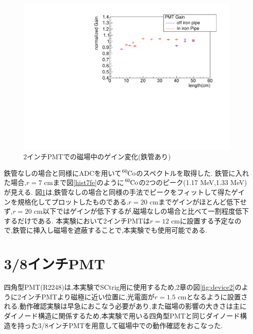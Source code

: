 \begin{figure}[h]
	\centering
		\includegraphics[angle=-90,width=15cm]{fig/iguchi/bigPMTfit.pdf}
	\caption{2インチPMTでの磁場中のゲイン変化(鉄管あり)}
	\label{bigPMTfit}
\end{figure}

鉄管なしの場合と同様にADCを用いて$\ce{^{60}Co}$のスペクトルを取得した.
鉄管に入れた場合,$r=7$ cmまで図\ref{hist7fe}のように$\ce{^{60}Co}$の2つのピーク(1.17 MeV,1.33 MeV)が見える.
図\ref{bigPMTfit}は,鉄管なしの場合と同様の手法でピークをフィットして得たゲインを規格化してプロットしたものである.$r=20$ cmまでゲインがほとんど低下せず,$r=20$ cm以下ではゲインが低下するが,磁場なしの場合と比べて一割程度低下するだけである.
本実験において2インチPMTは$r=12$ cmに設置する予定なので,鉄管に挿入し磁場を遮蔽することで,本実験でも使用可能である.


\newpage
\section{3/8インチPMT}
四角型PMT(R2248)\cite{pmtR2248}は,本実験でSCtrig用に使用するため,2章の図\ref{fig:device2}のように2インチPMTより磁極に近い位置に,光電面が$r=1.5$ cmとなるように設置される.動作確認実験は早急におこなう必要があり,また磁場の影響の大きさは主にダイノード構造に関係するため,本実験で用いる四角型PMTと同じダイノード構造を持った3/8インチPMT\cite{pmtH3164-10}を用意して磁場中での動作確認をおこなった.

